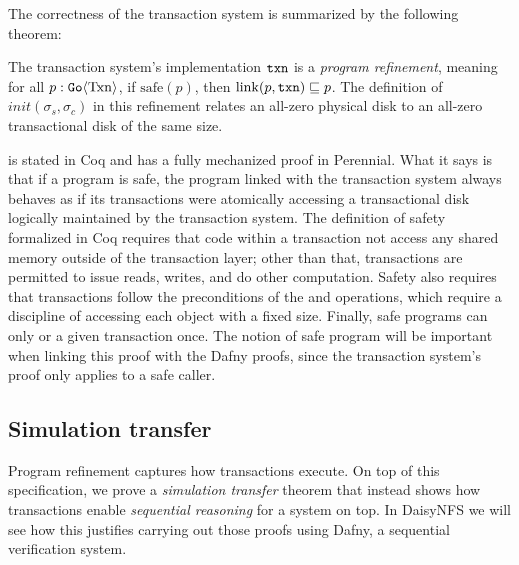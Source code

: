 The correctness of the transaction system is summarized by the following theorem:

\begin{theorem}
  The transaction system's implementation $\texttt{txn}$ is a \emph{program refinement}, meaning for
  all $p : \mathtt{Go}\langle \mathrm{Txn} \rangle$, if $\mathrm{safe}(p)$, then
  $\mathrm{link}(p, \texttt{txn}) \sqsubseteq p$. The definition of
  $init(\sigma_{s}, \sigma_{c})$ in this refinement relates an all-zero physical
  disk to an all-zero transactional disk of the same size.
  \label{thm:gotxn-program-refinement}
\end{theorem}

 is stated in Coq and has a fully mechanized proof in Perennial.
What it says is that if a program is safe, the program linked with the
transaction system always behaves as if its transactions were atomically
accessing a transactional disk logically maintained by the transaction system.
The definition of safety formalized in Coq requires that code within a
transaction not access any shared memory outside of the transaction layer; other
than that, transactions are permitted to issue reads, writes, and do other
computation. Safety also requires that transactions follow the preconditions of
the  and  operations, which require a discipline of accessing
each object with a fixed size. Finally, safe programs can only  or
 a given transaction once. The notion of safe program will be
important when linking this proof with the Dafny proofs, since the transaction
system's proof only applies to a safe caller.

\subsection{Simulation transfer}


Program refinement captures how transactions execute. On top of this
specification, we prove a \emph{simulation transfer} theorem that instead shows
how transactions enable \emph{sequential reasoning} for a system on top. In
DaisyNFS we will see how this justifies carrying out those proofs using Dafny, a
sequential verification system.

